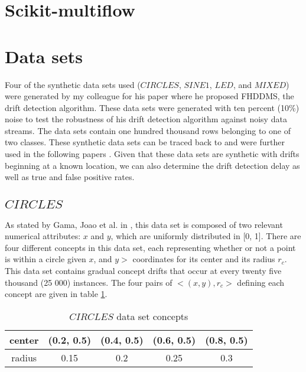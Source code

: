 \section{Scikit-multiflow}
\cite{skmultiflow}

\section{Data sets}
Four of the synthetic data sets used ($CIRCLES$, $SINE1$, $LED$, and $MIXED$) were generated by my colleague for his paper \cite{pesaranghader2016fast} where he proposed FHDDMS, the drift detection algorithm. These data sets were generated with ten percent (10\%) noise to test the robustness of his drift detection algorithm against noisy data streams. The data sets contain one hundred thousand rows belonging to one of two classes. These synthetic data sets can be traced back to \cite{10.1007/3-540-59286-5_74} and were further used in the following papers \cite{nishida2007detecting, gama2004learning, baena2006early}. Given that these data sets are synthetic with drifts beginning at a known location, we can also determine the drift detection delay as well as true and false positive rates.

\subsection{$CIRCLES$}
As stated by Gama, Joao et al. in \cite{gama2004learning}, this data set is composed of two relevant numerical attributes: $x$ and $y$, which are uniformly distributed in [0, 1]. There are four different concepts in this data set, each representing whether or not a point is within a circle given $x$, and $y>$ coordinates for its center and its radius $r_c$. This data set contains gradual concept drifts that occur at every twenty five thousand (25 000) instances. The four pairs of $<(x,y), r_c>$ defining each concept are given in table \ref{table:circle_concepts}.

\begin{table}[]
\centering
\caption{\label{table:circle_concepts}$CIRCLES$ data set concepts}
\begin{tabular}{|c|c|c|c|c|}
\hline
center & (0.2, 0.5) & (0.4, 0.5) & (0.6, 0.5) & (0.8, 0.5) \\ \hline
radius & 0.15       & 0.2        & 0.25       & 0.3        \\ \hline
\end{tabular}
\end{table}

